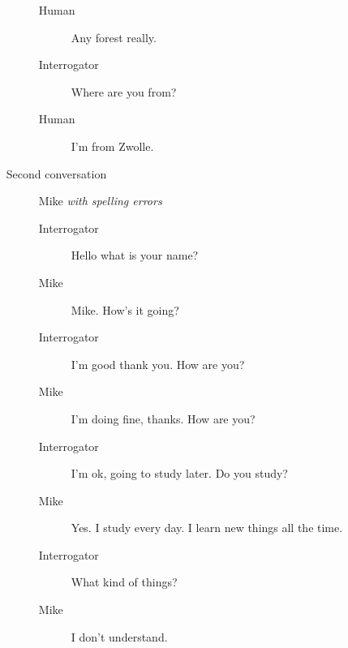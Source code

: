 \begin{itemize}
\begin{description}
\begin{description}
               \item [Human] Any forest really.
               \item [Interrogator] Where are you from?
               \item [Human] I'm from Zwolle.
            \end{description}
         \item [Second conversation] Mike \textit{with spelling errors}
            \begin{description}
               \item [Interrogator] Hello what is your name?
               \item [Mike] Mike. How's it going?
               \item [Interrogator] I'm good thank you. How are you?
               \item [Mike] I'm doing fine, thanks. How are you?
               \item [Interrogator] I'm ok, going to study later. Do you study?
               \item [Mike] Yes. I study every day. I learn new things all the time.
               \item [Interrogator] What kind of things?
               \item [Mike] I don't understand.
            \end{description}
      \end{description}


\end{itemize}
